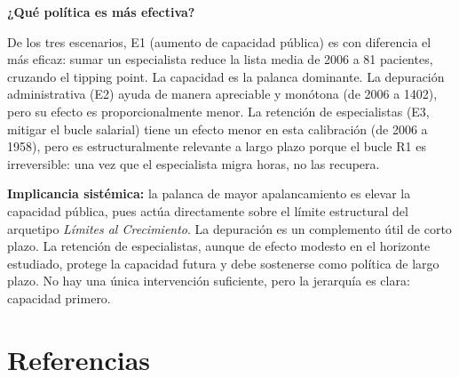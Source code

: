 \documentclass[12pt,a4paper]{article}
\begin{document}
\textbf{¿Qué política es más efectiva?}

De los tres escenarios, E1 (aumento de capacidad pública) es con diferencia el más eficaz: sumar un especialista reduce la lista media de 2006 a 81 pacientes, cruzando el tipping point. La capacidad es la palanca dominante. La depuración administrativa (E2) ayuda de manera apreciable y monótona (de 2006 a 1402), pero su efecto es proporcionalmente menor. La retención de especialistas (E3, mitigar el bucle salarial) tiene un efecto menor en esta calibración (de 2006 a 1958), pero es estructuralmente relevante a largo plazo porque el bucle R1 es irreversible: una vez que el especialista migra horas, no las recupera.

\textbf{Implicancia sistémica:} la palanca de mayor apalancamiento es elevar la capacidad pública, pues actúa directamente sobre el límite estructural del arquetipo \textit{Límites al Crecimiento}. La depuración es un complemento útil de corto plazo. La retención de especialistas, aunque de efecto modesto en el horizonte estudiado, protege la capacidad futura y debe sostenerse como política de largo plazo. No hay una única intervención suficiente, pero la jerarquía es clara: capacidad primero.

\newpage
\section*{Referencias}
\end{document}
